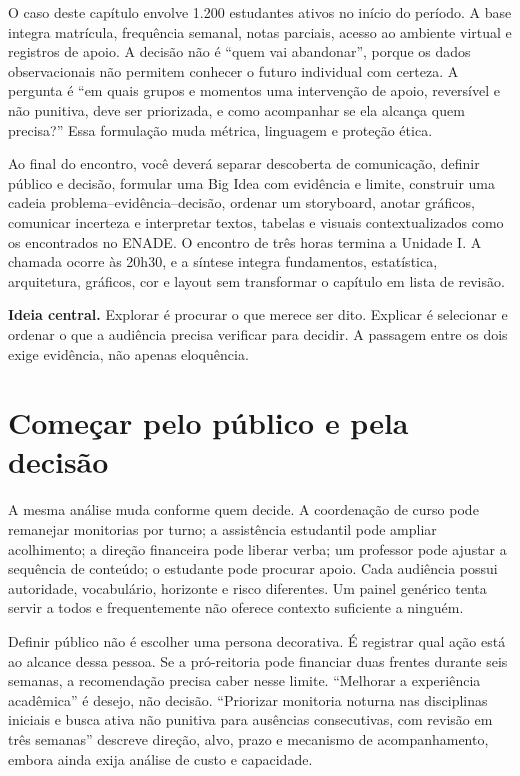 O caso deste capítulo envolve 1.200 estudantes ativos no início do período. A base integra matrícula, frequência semanal, notas parciais, acesso ao ambiente virtual e registros de apoio. A decisão não é ``quem vai abandonar'', porque os dados observacionais não permitem conhecer o futuro individual com certeza. A pergunta é ``em quais grupos e momentos uma intervenção de apoio, reversível e não punitiva, deve ser priorizada, e como acompanhar se ela alcança quem precisa?'' Essa formulação muda métrica, linguagem e proteção ética.

Ao final do encontro, você deverá separar descoberta de comunicação, definir público e decisão, formular uma Big Idea com evidência e limite, construir uma cadeia problema--evidência--decisão, ordenar um storyboard, anotar gráficos, comunicar incerteza e interpretar textos, tabelas e visuais contextualizados como os encontrados no ENADE. O encontro de três horas termina a Unidade I. A chamada ocorre às 20h30, e a síntese integra fundamentos, estatística, arquitetura, gráficos, cor e layout sem transformar o capítulo em lista de revisão.

\begin{SummaryBox}
\textbf{Ideia central.} Explorar é procurar o que merece ser dito. Explicar é selecionar e ordenar o que a audiência precisa verificar para decidir. A passagem entre os dois exige evidência, não apenas eloquência.
\end{SummaryBox}

\section{Começar pelo público e pela decisão}

A mesma análise muda conforme quem decide. A coordenação de curso pode remanejar monitorias por turno; a assistência estudantil pode ampliar acolhimento; a direção financeira pode liberar verba; um professor pode ajustar a sequência de conteúdo; o estudante pode procurar apoio. Cada audiência possui autoridade, vocabulário, horizonte e risco diferentes. Um painel genérico tenta servir a todos e frequentemente não oferece contexto suficiente a ninguém.

Definir público não é escolher uma persona decorativa. É registrar qual ação está ao alcance dessa pessoa. Se a pró-reitoria pode financiar duas frentes durante seis semanas, a recomendação precisa caber nesse limite. ``Melhorar a experiência acadêmica'' é desejo, não decisão. ``Priorizar monitoria noturna nas disciplinas iniciais e busca ativa não punitiva para ausências consecutivas, com revisão em três semanas'' descreve direção, alvo, prazo e mecanismo de acompanhamento, embora ainda exija análise de custo e capacidade.

